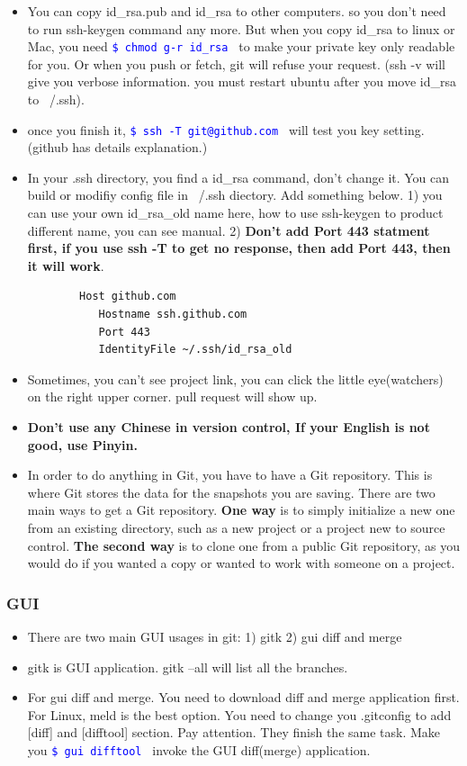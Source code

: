 \documentclass[a4paper,12pt,twoside]{book}
\newcommand{\linuxcommand}[1]{\texttt{\textcolor{blue}{\$ #1 \Pisymbol{psy}{191}}}}
\begin{document}
\begin{itemize}
\begin{itemize}
   \item You can copy id\_rsa.pub and id\_rsa to other computers. so you don't need to run ssh-keygen command any more. But when you copy id\_rsa to linux or Mac, you need \linuxcommand{chmod g-r id\_rsa} to make your private key only readable for you. Or when you push or fetch, git will refuse your request.  (ssh -v will give you verbose information. you must restart ubuntu after you move id\_rsa to ~/.ssh).


    \item once you finish it, \linuxcommand{ssh -T git@github.com} will test you key setting. (github has details explanation.)

\item In your .ssh directory, you find a id\_rsa command, don't change it. You can build or modifiy config file in ~/.ssh diectory. Add something below. 1) you can use your own id\_rsa\_old name here, how to use ssh-keygen to product different name, you can see manual. 2) \textbf{Don't add Port 443 statment first, if you use ssh -T to get no response, then add Port 443, then it will work}.
		\begin{verbatim}
		Host github.com
		   Hostname ssh.github.com
		   Port 443
		   IdentityFile ~/.ssh/id_rsa_old
		\end{verbatim}

    \item Sometimes, you can't see project link, you can click the little eye(watchers) on the right upper corner. pull request will show up.

\item \textbf{Don't use any Chinese in version control, If your English is not good, use
    Pinyin.}
    
\item In order to do anything in Git, you have to have a Git repository. This is where Git
    stores the data for the snapshots you are saving. There are two main ways to get a
    Git repository. \textbf{One way} is to simply initialize a new one from an existing
    directory, such as a new project or a project new to source control. \textbf{The
    second way} is to clone one from a public Git repository, as you would do if you
    wanted a copy or wanted to work with someone on a project.
\end{itemize}

\subsubsection{GUI}
\begin{itemize}
	\item There are two main GUI usages in git: 1) gitk 2) gui diff and merge    
    \item gitk is GUI application. gitk --all will list all the branches.
    \item For gui diff and merge.  You need to download diff and merge application first. For Linux, meld is the best option. You need to change you .gitconfig to add [diff] and [difftool] section. Pay attention. They finish the same task. Make you \linuxcommand{gui difftool} invoke the GUI diff(merge) application.  
       

\end{itemize}
\end{itemize}
\end{document}
